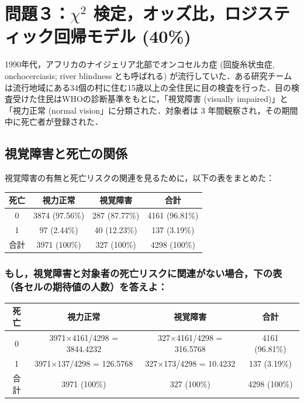 \documentclass[]{problemset}
\begin{document}
\hypertarget{chi2--40}{%
\section{\texorpdfstring{問題３：\(\chi^2\)
検定，オッズ比，ロジスティック回帰モデル
(40\%)}{問題３：\textbackslash{}chi\^{}2 検定，オッズ比，ロジスティック回帰モデル (40\%)}}\label{chi2--40}}

1990年代，アフリカのナイジェリア北部でオンコセルカ症 (回旋糸状虫症,
onchocerciasis; river blindness とも呼ばれる)
が流行していた．ある研究チームは流行地域にある34個の村に住む15歳以上の全住民に目の検査を行った．目の検査受けた住民はWHOの診断基準をもとに，「視覚障害
(visually impaired)」と「視力正常 (normal vision」に分類された．対象者は
3 年間観察され，その期間中に死亡者が登録された．

\subsection{視覚障害と死亡の関係}

視覚障害の有無と死亡リスクの関連を見るために，以下の表をまとめた：

\begin{center}
\begin{tabular}{|c|c|c|c|}
\hline
死亡 & 視力正常           & 視覚障害          & 合計             \\ \hline
0  & 3874 (97.56\%) & 287 (87.77\%) & 4161 (96.81\%) \\ \hline
1  & 97 (2.44\%)    & 40 (12.23\%)  & 137 (3.19\%)   \\ \hline
合計 & 3971 (100\%)   & 327 (100\%)   & 4298 (100\%)   \\ \hline
\end{tabular}
\end{center}

\subsubsection{もし，視覚障害と対象者の死亡リスクに関連がない場合，下の表（各セルの期待値の人数）を答えよ：}

\begin{center}
\begin{tabular}{|c|c|c|c|}
\hline
死亡 & 視力正常                     & 視覚障害                   & 合計             \\ \hline
0  & 3971$\times$4161/4298 = 3844.4232 & 327$\times$4161/4298 = 316.5768 & 4161 (96.81\%) \\ \hline
1  & 3971$\times$137/4298 = 126.5768   & 327$\times$173/4298 = 10.4232   & 137 (3.19\%)   \\ \hline
合計 & 3971 (100\%)             & 327 (100\%)            & 4298 (100\%)   \\ \hline
\end{tabular}
\end{center}
\end{document}
